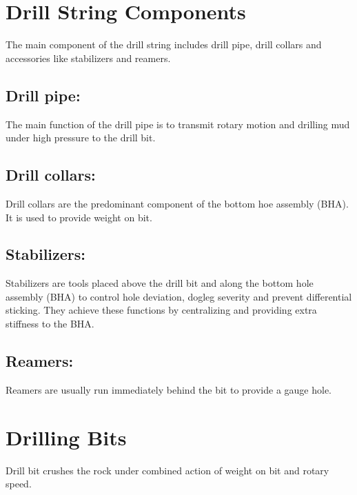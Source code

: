 \section*{Drill String Components}

The main component of the drill string includes drill pipe,
drill collars and accessories like stabilizers and reamers.
 	
\vspace{1em}

\subsection*{\textbf{Drill pipe:}} The main function of the drill pipe is to transmit rotary motion and
drilling mud under high pressure to the drill bit.

\vspace{1em}

\subsection*{\textbf{Drill collars:}} Drill collars are the predominant component of the bottom hoe assembly (BHA). 
It is used to provide weight on bit.

\vspace{1em}

\subsection*{\textbf{Stabilizers:}} Stabilizers are tools placed above the drill bit and along the bottom hole assembly (BHA)
to control hole deviation, dogleg severity and prevent differential sticking. 
They achieve these functions by centralizing and providing extra stiffness to the BHA.

\vspace{1em}


\subsection*{\textbf{Reamers:}} Reamers are usually run immediately behind the bit to provide a gauge hole.


\section*{Drilling Bits}

Drill bit crushes the rock under combined action of weight on bit and rotary speed.

